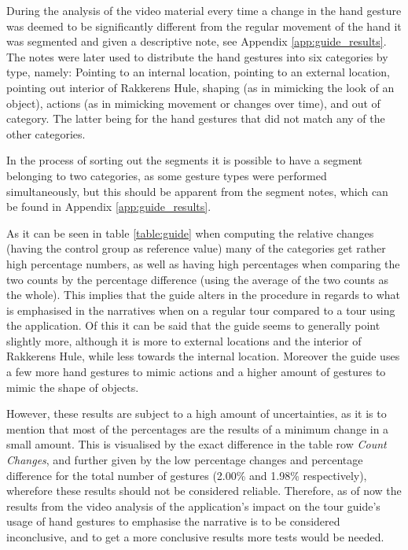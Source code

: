 During the analysis of the video material every time a change in the hand gesture was deemed to be significantly different from the regular movement of the hand it was segmented and given a descriptive note, see Appendix \ref{app:guide_results}. The notes were later used to distribute the hand gestures into six categories by type, namely: Pointing to an internal location, pointing to an external location, pointing out interior of Rakkerens Hule, shaping (as in mimicking the look of an object), actions (as in mimicking movement or changes over time), and out of category. The latter being for the hand gestures that did not match any of the other categories.

In the process of sorting out the segments it is possible to have a segment belonging to two categories, as some gesture types were performed simultaneously, but this should be apparent from the segment notes, which can be found in Appendix \ref{app:guide_results}.

As it can be seen in table \ref{table:guide} when computing the relative changes (having the control group as reference value) many of the categories get rather high percentage numbers, as well as having high percentages when comparing the two counts by the percentage difference (using the average of the two counts as the whole). This implies that the guide alters in the procedure in regards to what is emphasised in the narratives when on a regular tour compared to a tour using the application. Of this it can be said that the guide seems to generally point slightly more, although it is more to external locations and the interior of Rakkerens Hule, while less towards the internal location. Moreover the guide uses a few more hand gestures to mimic actions and a higher amount of gestures to mimic the shape of objects.

However, these results are subject to a high amount of uncertainties, as it is to mention that most of the percentages are the results of a minimum change in a small amount. This is visualised by the exact difference in the table row \textit{Count Changes}, and further given by the low percentage changes and percentage difference for the total number of gestures (2.00\% and 1.98\% respectively), wherefore these results should not be considered reliable. Therefore, as of now the results from the video analysis of the application’s impact on the tour guide’s usage of hand gestures to emphasise the narrative is to be considered inconclusive, and to get a more conclusive results more tests would be needed.

